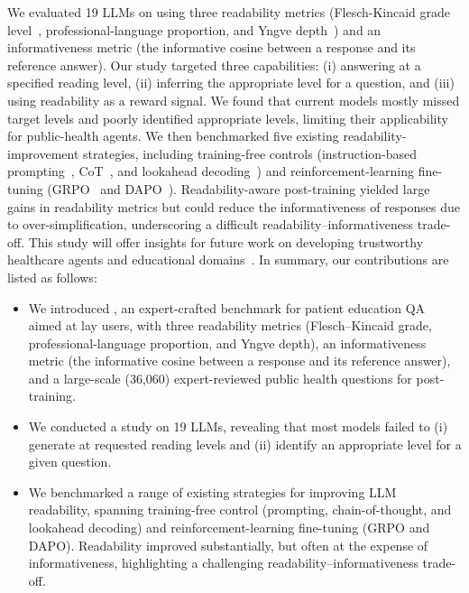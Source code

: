 We evaluated 19 LLMs on \repqa using three readability metrics (Flesch-Kincaid grade level~\citep{kincaid1975derivation}, professional-language proportion, and Yngve depth~\citep{yngve1960model}) and an informativeness metric (the informative cosine between a response and its reference answer).
Our study targeted three capabilities: (i) answering at a specified reading level, (ii) inferring the appropriate level for a question, and (iii) using readability as a reward signal.
We found that current models mostly missed target levels and poorly identified appropriate levels, limiting their applicability for public-health agents.
We then benchmarked five existing readability-improvement strategies, including training-free controls (instruction-based prompting~\citep{ribeiro-etal-2023-generating,malik2024tarzan}, CoT~\citep{wei2022chain}, and lookahead decoding~\citep{ribeiro-etal-2023-generating}) and reinforcement-learning fine-tuning (GRPO~\citep{shao2024deepseekmath} and DAPO~\citep{yu2025dapo}).
Readability-aware post-training yielded large gains in readability metrics but could reduce the informativeness of responses due to over-simplification, underscoring a difficult readability–informativeness trade-off.
This study will offer insights for future work on developing trustworthy healthcare agents and educational domains~\citep{wang2024large}.
In summary, our contributions are listed as follows:
\begin{itemize}[leftmargin=*]
\item We introduced \repqa, an expert-crafted benchmark for patient education QA aimed at lay users, with three readability metrics (Flesch–Kincaid grade, professional-language proportion, and Yngve depth), an informativeness metric (the informative cosine between a response and its reference answer), and a large-scale (36,060) expert-reviewed public health questions for post-training.

\item We conducted a study on 19 LLMs, revealing that most models failed to (i) generate at requested reading levels and (ii) identify an appropriate level for a given question.

\item We benchmarked a range of existing strategies for improving LLM readability, spanning training-free control (prompting, chain-of-thought, and lookahead decoding) and reinforcement-learning fine-tuning (GRPO and DAPO). Readability improved substantially, but often at the expense of informativeness, highlighting a challenging readability–informativeness trade-off.
\end{itemize}

